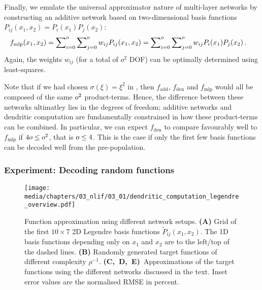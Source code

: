Finally, we emulate the universal approximator nature of multi-layer networks by constructing an additive network based on two-dimensional basis functions $P_{ij}(x_1, x_2) = P_{i}(x_1) P_j(x_2)$:
\begin{align}
	f_\mathrm{mlp}(x_1, x_2)
		&= \sum\nolimits_{i = 0}^{o} \sum\nolimits_{j = 0}^{o} w_{ij} P_{ij}(x_1, x_2) = \sum\nolimits_{i = 0}^{o} \sum\nolimits_{j = 0}^{o} w_{ij} P_{i}(x_1) P_j(x_2) \,.
	\label{eqn:f_mlp}
\end{align}
Again, the weights $w_{ij}$ (for a total of $o^2$ DOF) can be optimally determined using least-squares.

Note that if we had chosen $\sigma(\xi) = \xi^2$ in , then $f_\mathrm{add}$, $f_\mathrm{den}$ and $f_\mathrm{mlp}$ would all be composed of the same $o^2$ product-terms.
Hence, the difference between these networks ultimatley lies in the degrees of freedom; additive networks and dendritic computation are fundamentally constrained in how these product-terms can be combined.
In particular, we can expect $f_\mathrm{den}$ to compare favourably well to $f_\mathrm{mlp}$ if $4o \leq o^2$, that is $o \leq 4$.
This is the case if only the first few basis functions can be decoded well from the pre-population.

\subsubsection{Experiment: Decoding random functions}

\begin{figure}
	\texttt{[image: media/chapters/03\_nlif/03\_01/dendritic\_computation\_legendre\_overview.pdf]}%
	{\label{fig:dendritic_computation_legendre_overview_a}}%
	{\label{fig:dendritic_computation_legendre_overview_b}}%
	{\label{fig:dendritic_computation_legendre_overview_c}}%
	{\label{fig:dendritic_computation_legendre_overview_d}}%
	{\label{fig:dendritic_computation_legendre_overview_e}}%
	\caption[Function approximation using different network setups]{Function approximation using different network setups.
	\textbf{(A)} Grid of the first $10 \times 7$ 2D Legendre basis functions $\tilde P_{ij}(x_1, x_2)$. The 1D basis functions depending only on $x_1$ and $x_2$ are to the left/top of the dashed lines.
	\textbf{(B)} Randomly generated target functions of different complexity $\rho^{-1}$.
	\textbf{(C,~D,~E)}~Approximations of the target functions using the different networks discussed in the text. Inset error values are the normalised RMSE in percent.
	}
	\label{fig:dendritic_computation_legendre_overview}
\end{figure}

